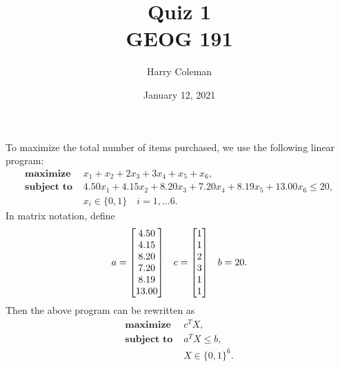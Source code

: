 \documentclass[12pt]{article}
\title{Quiz 1\\
    \large GEOG 191
}
\author{Harry Coleman}
\date{January 12, 2021}
\theoremstyle{definition}
\begin{document}
\maketitle

\noindent
To maximize the total number of items purchased, we use the following linear program:
\begin{align*}
    \textbf{maximize } & x_1 + x_2 + 2x_3 + 3x_4 + x_5 + x_6, \\
    \textbf{subject to } & 4.50x_1 + 4.15x_2 + 8.20x_3 + 7.20x_4 + 8.19x_5 + 13.00x_6 \leq 20, \\
                        & x_i \in \{0, 1\} \quad i = 1, \dots 6.
\end{align*}
In matrix notation, define
\[
    a = \mqty[4.50 \\ 4.15 \\ 8.20 \\ 7.20 \\ 8.19 \\ 13.00] \quad c = \mqty[1 \\ 1 \\ 2 \\ 3 \\ 1 \\ 1] \quad b = 20.
\]
Then the above program can be rewritten as
\begin{align*}
    \textbf{maximize } & c^TX, \\
    \textbf{subject to } & a^TX \leq b, \\
                        & X \in \{0, 1\}^6.
\end{align*}
\end{document}
